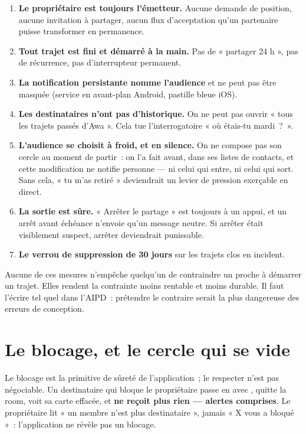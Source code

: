 \begin{enumerate}[leftmargin=1.6em]
  \item \textbf{Le propriétaire est toujours l'émetteur.} Aucune demande de position, aucune
        invitation à partager, aucun flux d'acceptation qu'un partenaire puisse transformer
        en permanence.
  \item \textbf{Tout trajet est fini et démarré à la main.} Pas de « partager 24 h », pas de
        récurrence, pas d'interrupteur permanent.
  \item \textbf{La notification persistante nomme l'audience} et ne peut pas être masquée
        (service en avant-plan Android, pastille bleue iOS).
  \item \textbf{Les destinataires n'ont pas d'historique.} On ne peut pas ouvrir « tous les
        trajets passés d'Awa ». Cela tue l'interrogatoire « où étais-tu mardi~?~».
  \item \textbf{L'audience se choisit à froid, et en silence.} On ne compose pas son cercle
        au moment de partir~: on l'a fait avant, dans ses listes de contacts, et cette
        modification ne notifie personne --- ni celui qui entre, ni celui qui sort. Sans
        cela, « tu m'as retiré » deviendrait un levier de pression exerçable en direct.
  \item \textbf{La sortie est sûre.} « Arrêter le partage » est toujours à un appui, et un
        arrêt avant échéance n'envoie qu'un message neutre. Si arrêter était visiblement
        suspect, arrêter deviendrait punissable.
  \item \textbf{Le verrou de suppression de 30 jours} sur les trajets clos en incident.
\end{enumerate}

\begin{alerte}
Aucune de ces mesures n'empêche quelqu'un de contraindre un proche à démarrer un trajet.
Elles rendent la contrainte moins rentable et moins durable. Il faut l'écrire tel quel dans
l'AIPD~: prétendre le contraire serait la plus dangereuse des erreurs de conception.
\end{alerte}

\section{Le blocage, et le cercle qui se vide}

Le blocage est la primitive de sûreté de l'application~; le respecter n'est pas négociable.
Un destinataire qui bloque le propriétaire passe en  avec
, quitte la room, voit sa carte effacée, et
\textbf{ne reçoit plus rien --- alertes comprises}. Le propriétaire lit « un membre n'est
plus destinataire », jamais « X vous a bloqué »~: l'application ne révèle pas un blocage.

